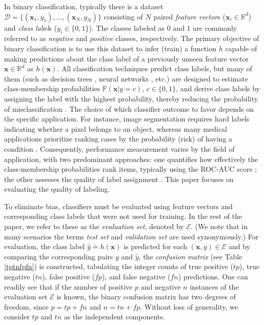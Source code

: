 \documentclass[3p, times]{elsarticle}
\begin{document}
In binary classification, typically there is a dataset $\mathcal{D} = \lbrace(\mathbf{x}_1, y_1), \dots, (\mathbf{x}_N, y_N)\rbrace$ consisting of $N$ paired \emph{feature vector}s ($\mathbf{x}_i\in\mathbb{R}^{d}$) and \emph{class label}s ($y_i\in\lbrace 0, 1\rbrace$). The classes labeled as $0$ and $1$ are commonly referred to as \emph{negative} and \emph{positive} classes, respectively.
The primary objective of binary classification is to use this dataset to infer (train) a function $h$ capable of making predictions about the class label of a previously unseen feature vector $\mathbf{x}\in\mathbb{R}^d$ as $h(\mathbf{x})$. All classification techniques predict class labels, but many of them (such as decision trees \cite{mlbook}, neural networks \cite{mlbook}, etc.) are designed to estimate class-membership probabilities $\mathbb{P}(\mathbf{x}|y=c)$, $c\in\lbrace 0, 1\rbrace$, and derive class labels by assigning the label with the highest probability, thereby reducing the probability of misclassification \cite{bayesclassifier}. The choice of which classifier outcome to favor depends on the specific application. For instance, image segmentation \cite{segmentation} requires hard labels indicating whether a pixel belongs to an object, whereas many medical applications prioritize ranking cases by the probability (risk) of having a condition \cite{binclasranking}. Consequently, performance measurement varies by the field of application, with two predominant approaches: one quantifies how effectively the class-membership probabilities rank items, typically using the ROC-AUC score \cite{aucsurvey, auc}; the other assesses the quality of label assignment \cite{scores}. This paper focuses on evaluating the quality of labeling.

To eliminate bias, classifiers must be evaluated using feature vectors and corresponding class labels that were not used for training. In the rest of the paper, we refer to these as the \emph{evaluation set}, denoted by $\mathcal{E}$. (We note that in many scenarios the terms \emph{test set} and \emph{validation set} are used synonymously.) For evaluation, the class label $\hat{y} \doteq h(\mathbf{x})$ is predicted for each $(\mathbf{x}, y)\in\mathcal{E}$ and by comparing the corresponding pairs $y$ and $\hat{y}$, the \emph{confusion matrix} (see Table \ref{tptnfpfn}) is constructed, tabulating the integer counts of true positive ($tp$), true negative ($tn$), false positive ($fp$), and false negative ($fn$) predictions. 
One can readily see that if the number of positive $p$ and negative $n$ instances of the evaluation set $\mathcal{E}$ is known, the binary confusion matrix has two degrees of freedom, since $p = tp + fn$ and $n = tn + fp$. Without loss of generality, we consider $tp$ and $tn$ as the independent components.
\end{document}
